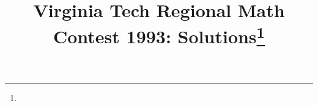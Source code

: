 \documentclass[10pt]{article}
\begin{document}
\title{Virginia Tech Regional Math Contest 1993: Solutions\footnote{\disclaimer}}
\author{\vspace{-2ex}}
\date{\vspace{-5ex}} %
\maketitle

%

%

%

%

%

%

%

%
\end{document}

